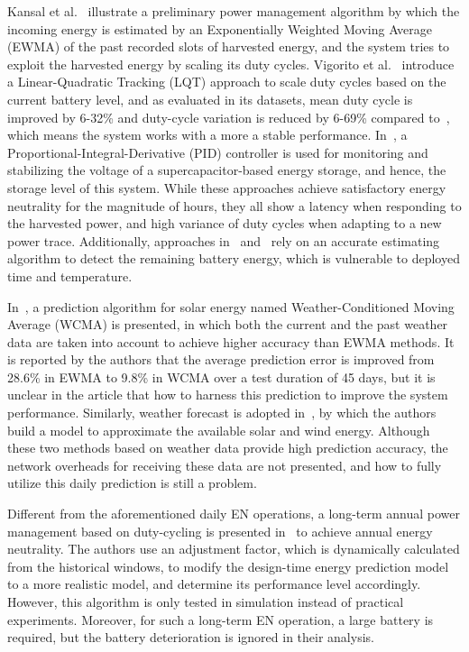 Kansal et al.~\cite{kansal2007power} illustrate a preliminary power management algorithm by which the incoming energy is estimated by an Exponentially Weighted Moving Average (EWMA) of the past recorded slots of harvested energy, and the system tries to exploit the harvested energy by scaling its duty cycles. Vigorito et al.~\cite{vigorito2007adaptive} introduce a Linear-Quadratic Tracking (LQT) approach to scale duty cycles based on the current battery level, and as evaluated in its datasets, mean duty cycle is improved by 6-32\% and duty-cycle variation is reduced by 6-69\% compared to~\cite{kansal2007power}, which means the system works with a more a stable performance. In~\cite{le2012power}, a Proportional-Integral-Derivative (PID) controller is used for monitoring and stabilizing the voltage of a supercapacitor-based energy storage, and hence, the storage level of this system. While these approaches achieve satisfactory energy neutrality for the magnitude of hours, they all show a latency when responding to the harvested power, and high variance of duty cycles when adapting to a new power trace. Additionally, approaches in~\cite{vigorito2007adaptive} and~\cite{kansal2007power} rely on an accurate estimating algorithm to detect the remaining battery energy, which is vulnerable to deployed time and temperature. 

In~\cite{piorno2009prediction}, a prediction algorithm for solar energy named Weather-Conditioned Moving Average (WCMA) is presented, in which both the current and the past weather data are taken into account to achieve higher accuracy than EWMA methods. It is reported by the authors that the average prediction error is improved from 28.6\% in EWMA to 9.8\% in WCMA over a test duration of 45 days, but it is unclear in the article that how to harness this prediction to improve the system performance. Similarly, weather forecast is adopted in~\cite{sharma2010cloudy}, by which the authors build a model to approximate the available solar and wind energy. Although these two methods based on weather data provide high prediction accuracy, the network overheads for receiving these data are not presented, and how to fully utilize this daily prediction is still a problem.

Different from the aforementioned daily EN operations, a long-term annual power management based on duty-cycling is presented in~\cite{buchli2014dynamic} to achieve annual energy neutrality. The authors use an adjustment factor, which is dynamically calculated from the historical windows, to modify the design-time energy prediction model to a more realistic model, and determine its performance level accordingly. However, this algorithm is only tested in simulation instead of practical experiments. Moreover, for such a long-term EN operation, a large battery is required, but the battery deterioration is ignored in their analysis.

